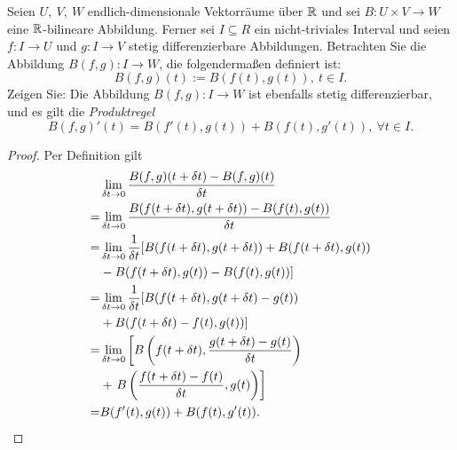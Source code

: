 \begin{Problem}
Seien $U,~V,~W$ endlich-dimensionale Vektorräume über $\mathbb{R}$ und sei $B : U \times V \to W$ eine $\mathbb{R}$-bilineare Abbildung. Ferner sei $I \subseteq R$ ein nicht-triviales Interval und seien $f : I \to U$ und $g : I \to V$ stetig differenzierbare Abbildungen. Betrachten Sie die Abbildung $B(f, g): I \to W$, die folgendermaßen definiert ist:	
\[
B(f,g)(t):=B(f(t),g(t)),~t\in I
.\] 
Zeigen Sie: Die Abbildung $B(f, g) : I \to W$ ist ebenfalls stetig differenzierbar, und es gilt die \emph{Produktregel}
\[
B(f,g)'(t)=B(f'(t),g(t))+B(f(t),g'(t)),~\forall t\in I
.\] 
\end{Problem}
\begin{proof}
Per Definition gilt
\begin{align*}
	&\lim_{\delta t \to 0} \frac{B(f,g)(t+\delta t)-B(f,g)(t)}{\delta t}\\
	=&\lim_{\delta t \to 0} \frac{B(f(t+\delta t), g(t+\delta t))-B(f(t),g(t))}{\delta t}\\
	=&\lim_{\delta t \to 0}\frac{1}{\delta t}[B(f(t+\delta t),g(t+\delta t))+B(f(t+\delta t), g(t))\\
	&-B(f(t+\delta t), g(t)) - B(f(t),g(t))] \\
	=&\lim_{\delta t \to 0} \frac{1}{\delta t}[B(f(t+\delta t), g(t+\delta t)-g(t))\\
	&+B(f(t+\delta t)-f(t), g(t))]\\
	=&\lim_{\delta t \to 0} \left[ B\left( f(t+\delta t), \frac{g(t+\delta t)-g(t)}{\delta t} \right)\right.\\
	&+\left. B\left( \frac{f(t+\delta t)-f(t)}{\delta t}, g(t) \right) \right]\\
	=& B(f'(t),g(t))+B(f(t),g'(t)).\qedhere
\end{align*}
\end{proof}

